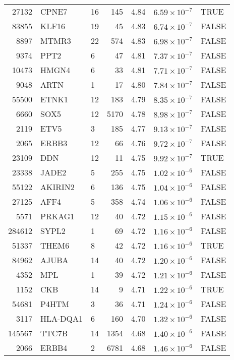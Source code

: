 \begin{table}[ht]
\begin{adjustbox}{totalheight=10in}
\begin{tabular}{rllrrrl}
  27132 & CPNE7 & 16 & 145 & 4.84 & $6.59 \times 10^{-7}$ & TRUE \\ 
  83855 & KLF16 & 19 &  45 & 4.83 & $6.74 \times 10^{-7}$ & FALSE \\ 
  8897 & MTMR3 & 22 & 574 & 4.83 & $6.98 \times 10^{-7}$ & FALSE \\ 
  9374 & PPT2 & 6 &  47 & 4.81 & $7.37 \times 10^{-7}$ & FALSE \\ 
  10473 & HMGN4 & 6 &  33 & 4.81 & $7.71 \times 10^{-7}$ & FALSE \\ 
  9048 & ARTN & 1 &  17 & 4.80 & $7.84 \times 10^{-7}$ & FALSE \\ 
  55500 & ETNK1 & 12 & 183 & 4.79 & $8.35 \times 10^{-7}$ & FALSE \\ 
  6660 & SOX5 & 12 & 5170 & 4.78 & $8.98 \times 10^{-7}$ & FALSE \\ 
  2119 & ETV5 & 3 & 185 & 4.77 & $9.13 \times 10^{-7}$ & FALSE \\ 
  2065 & ERBB3 & 12 &  66 & 4.76 & $9.72 \times 10^{-7}$ & FALSE \\ 
  23109 & DDN & 12 &  11 & 4.75 & $9.92 \times 10^{-7}$ & TRUE \\ 
  23338 & JADE2 & 5 & 255 & 4.75 & $1.02 \times 10^{-6}$ & FALSE \\ 
  55122 & AKIRIN2 & 6 & 136 & 4.75 & $1.04 \times 10^{-6}$ & FALSE \\ 
  27125 & AFF4 & 5 & 358 & 4.74 & $1.06 \times 10^{-6}$ & FALSE \\ 
  5571 & PRKAG1 & 12 &  40 & 4.72 & $1.15 \times 10^{-6}$ & FALSE \\ 
  284612 & SYPL2 & 1 &  69 & 4.72 & $1.16 \times 10^{-6}$ & FALSE \\ 
  51337 & THEM6 & 8 &  42 & 4.72 & $1.16 \times 10^{-6}$ & TRUE \\ 
  84962 & AJUBA & 14 &  40 & 4.72 & $1.20 \times 10^{-6}$ & FALSE \\ 
  4352 & MPL & 1 &  39 & 4.72 & $1.21 \times 10^{-6}$ & FALSE \\ 
  1152 & CKB & 14 &   9 & 4.71 & $1.22 \times 10^{-6}$ & TRUE \\ 
  54681 & P4HTM & 3 &  36 & 4.71 & $1.24 \times 10^{-6}$ & FALSE \\ 
  3117 & HLA-DQA1 & 6 & 160 & 4.70 & $1.32 \times 10^{-6}$ & FALSE \\ 
  145567 & TTC7B & 14 & 1354 & 4.68 & $1.40 \times 10^{-6}$ & FALSE \\ 
  2066 & ERBB4 & 2 & 6781 & 4.68 & $1.46 \times 10^{-6}$ & FALSE \\ 

\end{tabular}
\end{adjustbox}
\end{table}
